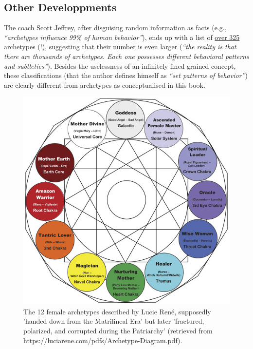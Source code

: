 \documentclass[
]{book}
\begin{document}
\hypertarget{other-developpments}{%
\subsection{Other Developpments}\label{other-developpments}}

The coach Scott Jeffrey, after disguising random information as facts (e.g., \emph{``archetypes influence 99\% of human behavior''}), ends up with a list of \href{https://scottjeffrey.com/archetypes-list/}{over 325} archetypes (!), suggesting that their number is even larger (\emph{``the reality is that there are thousands of archetypes. Each one possesses different behavioral patterns and subtleties''}). Besides the uselessness of an infinitely fined-grained concept, these classifications (that the author defines himself as \emph{``set patterns of behavior''}) are clearly different from archetypes as conceptualised in this book.

\begin{figure}

{\centering \includegraphics[width=\textwidth]{img/female_archetypes} 

}

\caption{The 12 female archetypes described by Lucie René, supposedly 'handed down from the Matrilineal Era' but later 'fractured, polarized, and corrupted during the Patriarchy' (retrieved from https://luciarene.com/pdfs/Archetype-Diagram.pdf).}\label{fig:unnamed-chunk-12}
\end{figure}
\end{document}
